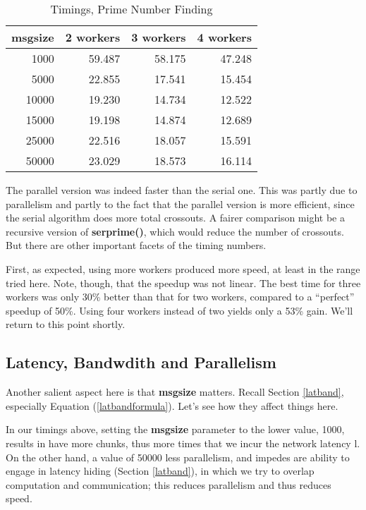 \begin{table}
\begin{center}
\vskip 0.5in
\begin{tabular}{|r|r|r|r|}
\hline
{\bf msgsize} & 2 workers & 3 workers & 4 workers \\ \hline 
1000 & 59.487 & 58.175 & 47.248 \\ \hline 
5000 & 22.855 & 17.541 & 15.454 \\ \hline 
10000 & 19.230 & 14.734 & 12.522 \\ \hline 
15000 & 19.198 & 14.874 & 12.689 \\ \hline 
25000 & 22.516 & 18.057 & 15.591 \\ \hline 
50000 & 23.029 & 18.573 & 16.114 \\ \hline 
\end{tabular}
\end{center}
\caption{Timings, Prime Number Finding}
\label{primestimes}
\end{table}


The parallel version was indeed faster than the serial one.  This was
partly due to parallelism and partly to the fact that the parallel
version is more efficient, since the serial algorithm does more total
crossouts.  A fairer comparison might be a recursive version of {\bf
serprime()}, which would reduce the number of crossouts.  But there are
other important facets of the timing numbers.

First, as expected, using more workers produced more speed, at least in
the range tried here.  Note, though, that the speedup was not linear.
The best time for three workers was only 30\% better than that for two
workers, compared to a ``perfect'' speedup of 50\%.  Using four workers
instead of two yields only a 53\% gain.  We'll return to this point
shortly.

\subsection{Latency, Bandwdith and Parallelism}
\label{latbandpar}

Another salient aspect here is that {\bf msgsize} matters.  Recall
Section \ref{latband}, especially Equation (\ref{latbandformula}).
Let's see how they affect things here.

In our timings above, setting the {\bf msgsize} parameter to the lower
value, 1000, results in have more chunks, thus more times that we incur
the network latency l.  On the other hand, a value of 50000 less
parallelism, and impedes are ability to engage in latency hiding
(Section \ref{latband}), in which we try to overlap computation and
communication; this reduces parallelism and thus reduces speed.

